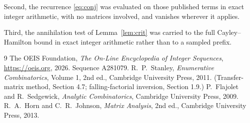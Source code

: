 \documentclass[11pt,a4paper]{article}
\theoremstyle{plain}
\theoremstyle{definition}
\begin{document}
Second, the recurrence \eqref{eq:conj} was evaluated on those published terms in exact
integer arithmetic, with no matrices involved, and vanishes wherever it applies.

Third, the annihilation test of Lemma~\ref{lem:crit} was carried to the full
Cayley--Hamilton bound in exact integer arithmetic rather than to a sampled prefix.

\begin{thebibliography}{9}
 The OEIS Foundation, \emph{The On-Line Encyclopedia of Integer
Sequences}, \url{https://oeis.org}, 2026. Sequence A281079.
 R.~P.~Stanley, \emph{Enumerative Combinatorics}, Volume 1, 2nd ed.,
Cambridge University Press, 2011. (Transfer-matrix method, Section 4.7; falling-factorial
inversion, Section 1.9.)
 P.~Flajolet and R.~Sedgewick, \emph{Analytic Combinatorics}, Cambridge
University Press, 2009.
 R.~A.~Horn and C.~R.~Johnson, \emph{Matrix Analysis}, 2nd ed., Cambridge
University Press, 2013.
\end{thebibliography}
\end{document}
